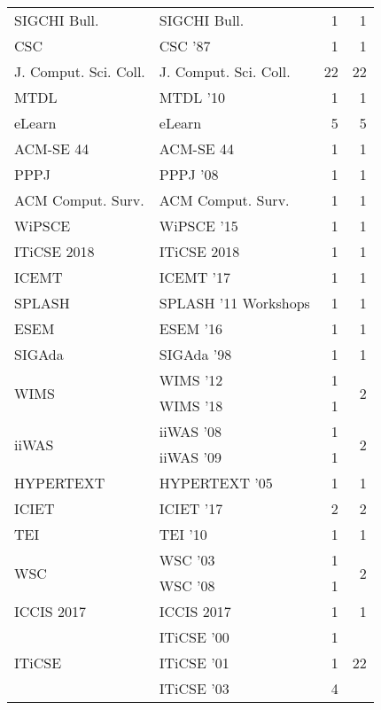 \begin{table*}[t]
\begin{tabular}{llrr}
\multirow{1}{*}{SIGCHI Bull.} & SIGCHI Bull. & 1 & \multirow{1}{*}{1}\\
\multirow{1}{*}{CSC } & CSC '87 & 1 & \multirow{1}{*}{1}\\
\multirow{1}{*}{J. Comput. Sci. Coll.} & J. Comput. Sci. Coll. & 22 & \multirow{1}{*}{22}\\
\multirow{1}{*}{MTDL } & MTDL '10 & 1 & \multirow{1}{*}{1}\\
\multirow{1}{*}{eLearn} & eLearn & 5 & \multirow{1}{*}{5}\\
\multirow{1}{*}{ACM-SE 44} & ACM-SE 44 & 1 & \multirow{1}{*}{1}\\
\multirow{1}{*}{PPPJ } & PPPJ '08 & 1 & \multirow{1}{*}{1}\\
\multirow{1}{*}{ACM Comput. Surv.} & ACM Comput. Surv. & 1 & \multirow{1}{*}{1}\\
\multirow{1}{*}{WiPSCE } & WiPSCE '15 & 1 & \multirow{1}{*}{1}\\
\multirow{1}{*}{ITiCSE 2018} & ITiCSE 2018 & 1 & \multirow{1}{*}{1}\\
\multirow{1}{*}{ICEMT } & ICEMT '17 & 1 & \multirow{1}{*}{1}\\
\multirow{1}{*}{SPLASH } & SPLASH '11 Workshops & 1 & \multirow{1}{*}{1}\\
\multirow{1}{*}{ESEM } & ESEM '16 & 1 & \multirow{1}{*}{1}\\
\multirow{1}{*}{SIGAda } & SIGAda '98 & 1 & \multirow{1}{*}{1}\\
\multirow{2}{*}{WIMS } & WIMS '12 & 1 & \multirow{2}{*}{2}\\
& WIMS '18 & 1 &\\
\multirow{2}{*}{iiWAS } & iiWAS '08 & 1 & \multirow{2}{*}{2}\\
& iiWAS '09 & 1 &\\
\multirow{1}{*}{HYPERTEXT } & HYPERTEXT '05 & 1 & \multirow{1}{*}{1}\\
\multirow{1}{*}{ICIET } & ICIET '17 & 2 & \multirow{1}{*}{2}\\
\multirow{1}{*}{TEI } & TEI '10 & 1 & \multirow{1}{*}{1}\\
\multirow{2}{*}{WSC } & WSC '03 & 1 & \multirow{2}{*}{2}\\
& WSC '08 & 1 &\\
\multirow{1}{*}{ICCIS 2017} & ICCIS 2017 & 1 & \multirow{1}{*}{1}\\
\multirow{14}{*}{ITiCSE } & ITiCSE '00 & 1 & \multirow{14}{*}{22}\\
& ITiCSE '01 & 1 &\\
& ITiCSE '03 & 4 &\\

\end{tabular}
\end{table*}
